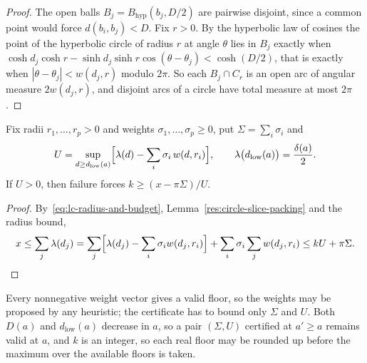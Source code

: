 \documentclass[11pt]{article}
\begin{document}
\begin{proof}
The open balls $B_j=B_{\mathrm{hyp}}(b_j,D/2)$ are pairwise disjoint, since a
common point would force $d(b_i,b_j)<D$.  Fix $r>0$.  By the hyperbolic law of
cosines the point of the hyperbolic circle of radius $r$ at angle $\theta$
lies in $B_j$ exactly when
$\cosh d_j\cosh r-\sinh d_j\sinh r\cos(\theta-\theta_j)<\cosh(D/2)$, that is
exactly when $|\theta-\theta_j|<w(d_j,r)$ modulo $2\pi$.  So each
$B_j\cap C_r$ is an open arc of angular measure $2w(d_j,r)$, and disjoint arcs
of a circle have total measure at most $2\pi$.
\end{proof}

\begin{theorem}\label{res:dual-arity-floor}
Fix radii $r_1,\ldots,r_p>0$ and weights $\sigma_1,\ldots,\sigma_p\ge0$, put
$\Sigma=\sum_i\sigma_i$ and
\[
 U=\sup_{d\ge d_{\mathrm{low}}(a)}
   \Bigl[\lambda(d)-\sum_i\sigma_i\,w(d,r_i)\Bigr],
 \qquad
 \lambda\bigl(d_{\mathrm{low}}(a)\bigr)=\frac{\delta(a)}2 .
\]
If $U>0$, then failure forces $k\ge(x-\pi\Sigma)/U$.
\end{theorem}

\begin{proof}
By~\eqref{eq:lc-radius-and-budget}, Lemma~\ref{res:circle-slice-packing} and
the radius bound,
\[
 x\le\sum_j\lambda(d_j)
  =\sum_j\Bigl[\lambda(d_j)-\sum_i\sigma_i w(d_j,r_i)\Bigr]
    +\sum_i\sigma_i\sum_j w(d_j,r_i)
  \le kU+\pi\Sigma. \qedhere
\]
\end{proof}

Every nonnegative weight vector gives a valid floor, so the weights may be
proposed by any heuristic; the certificate has to bound only $\Sigma$ and $U$.
Both $D(a)$ and $d_{\mathrm{low}}(a)$ decrease in $a$, so a pair
$(\Sigma,U)$ certified at $a'\ge a$ remains valid at $a$, and $k$ is an
integer, so each real floor may be rounded up before the maximum over the
available floors is taken.
\end{document}
